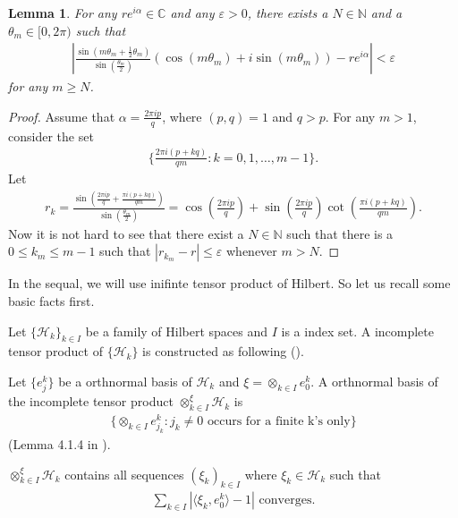 \documentclass[a4paper,10pt]{amsart}
\newtheorem{lemma}{Lemma}[section]
\newcommand{\HHH}{\mathcal H} %
\newcommand{\C}{\mathbb C} %
\newcommand{\N}{\mathbb N} %
\begin{document}
\begin{lemma}
    For any $re^{i\alpha} \in \C$ and any $\varepsilon > 0$, 
   there exists a $N \in \N$ and a $\theta_{m} \in [0, 2\pi)$
   such that
   \begin{align*}
      |\frac{\sin (m\theta_m + \frac{1}{2}\theta_m)}
       {\sin (\frac{\theta_m}{2})} \left (
   \cos (m\theta_m) + i\sin (m\theta_m) \right) - re^{i\alpha}| 
   < \varepsilon
   \end{align*}
   for any $m \geq N$.
\end{lemma}

\begin{proof}
    Assume that $\alpha = \frac{2\pi i p}{q}$, where $(p, q) = 1$ and 
    $q > p$. For any $m > 1$, consider the set
    \begin{align*}
        \{\frac{2\pi i (p + kq)}{qm} : k = 0, 1, \ldots, m-1 \}. 
    \end{align*}
    Let  
    \begin{align*}
        r_{k} = \frac{\sin (\frac{2\pi i p}{q}+ 
        \frac{\pi i (p + kq)}{qm})}
        {\sin (\frac{\theta_m}{2})}
     = \cos (\frac{2\pi i p}{q}) + \sin (\frac{2\pi i p}{q})
     \cot (\frac{\pi i (p + kq)}{qm}).
    \end{align*}
    Now it is not hard to see that there exist a $N \in \N$ such that
    there is a $0 \leq k_m \leq m-1$ such that 
    $|r_{k_m} - r| \leq \varepsilon$ whenever $m > N$. 
\end{proof}

In the sequal, we will use inifinte tensor product of Hilbert. So
let us recall some basic facts first.

Let $\{\HHH_k\}_{k \in I}$ be a family of Hilbert spaces and $I$ is a 
index set. A incomplete tensor product of $\{\HHH_k\}$ is constructed 
as following (\cite{V}).

Let $\{e^{k}_{j}\}$ be a orthnormal basis of $\HHH_k$ and 
$\xi = \otimes_{k \in I} e^{k}_{0}$. A orthnormal basis of the 
incomplete tensor product $\otimes_{k \in I}^{\xi} \HHH_{k}$ is
\begin{align*}
    \{ \otimes_{k \in I}e^{k}_{j_k} : j_k \neq 0 \mbox{ occurs for a finite 
    k's only}\}
\end{align*}
(Lemma 4.1.4 in \cite{V}).

$\otimes_{k \in I}^{\xi} \HHH_{k}$ contains all sequences 
$(\xi_{k})_{k \in I}$ where $\xi_{k} \in \HHH_k$ such that
\begin{align*}
    \sum_{k \in I}|\langle \xi_k, e^{k}_{0} \rangle -1 | \mbox{ converges.} 
\end{align*}
\end{document}
